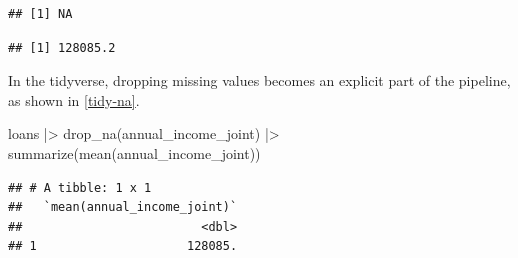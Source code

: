 \documentclass[12pt]{article}
\newenvironment{Shaded}{\begin{snugshade}}{\end{snugshade}}
\newcommand{\AttributeTok}[1]{\textcolor[rgb]{0.77,0.63,0.00}{#1}}
\newcommand{\ConstantTok}[1]{\textcolor[rgb]{0.00,0.00,0.00}{#1}}
\newcommand{\FunctionTok}[1]{\textcolor[rgb]{0.00,0.00,0.00}{#1}}
\newcommand{\NormalTok}[1]{#1}
\newcommand{\SpecialCharTok}[1]{\textcolor[rgb]{0.00,0.00,0.00}{#1}}
\begin{document}
\linespread{1}

\begin{Shaded}
\end{Shaded}

\begin{verbatim}
## [1] NA
\end{verbatim}

\begin{Shaded}
\end{Shaded}

\begin{verbatim}
## [1] 128085.2
\end{verbatim}


\label{base-na} \linespread{2} \vspace{3mm}\setlength{\parindent}{15pt}

In the tidyverse, dropping missing values becomes an explicit part of
the pipeline, as shown in \ref{tidy-na}.

\linespread{1}

\begin{Shaded}
\begin{Highlighting}[]
\NormalTok{loans }\SpecialCharTok{|\textgreater{}}
  \FunctionTok{drop\_na}\NormalTok{(annual\_income\_joint) }\SpecialCharTok{|\textgreater{}}
  \FunctionTok{summarize}\NormalTok{(}\FunctionTok{mean}\NormalTok{(annual\_income\_joint))}
\end{Highlighting}
\end{Shaded}

\begin{verbatim}
## # A tibble: 1 x 1
##   `mean(annual_income_joint)`
##                         <dbl>
## 1                     128085.
\end{verbatim}


\label{tidy-na} \linespread{2} \vspace{3mm}\setlength{\parindent}{15pt}
\end{document}
